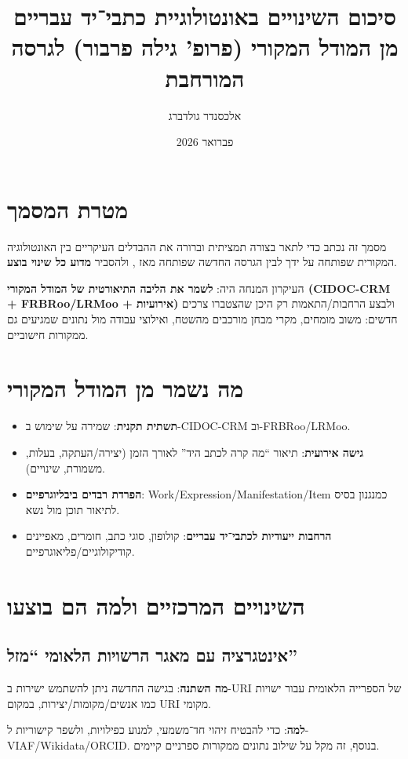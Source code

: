 \documentclass[12pt,a4paper]{article}
\title{%
\textbf{\Large סיכום השינויים באונטולוגיית כתבי־יד עבריים}\\[0.5em]
\normalsize מן המודל המקורי (פרופ' גילה פרבור) לגרסה המורחבת \en{(v1.4)}
}
\author{אלכסנדר גולדברג}
\date{פברואר 2026}
\newcommand{\en}[1]{\textenglish{\LR{#1}}}
\begin{document}
\maketitle

\section{מטרת המסמך}
מסמך זה נכתב כדי לתאר בצורה תמציתית וברורה את ההבדלים העיקריים בין האונטולוגיה המקורית שפותחה על ידך לבין הגרסה החדשה שפותחה מאז \en{(v1.4)}, ולהסביר \textbf{מדוע כל שינוי בוצע}. 

העיקרון המנחה היה: \textbf{לשמר את הליבה התיאורטית של המודל המקורי (CIDOC-CRM + FRBRoo/LRMoo + אירועיות)} ולבצע הרחבות/התאמות רק היכן שהצטברו צרכים חדשים: משוב מומחים, מקרי מבחן מורכבים מהשטח, ואילוצי עבודה מול נתונים שמגיעים גם ממקורות חישוביים.

\section{מה נשמר מן המודל המקורי}
\begin{itemize}
\item \textbf{תשתית תקנית}: שמירה על שימוש ב-\textenglish{CIDOC-CRM} וב-\textenglish{FRBRoo/LRMoo}.
\item \textbf{גישה אירועית}: תיאור ``מה קרה לכתב היד'' לאורך הזמן (יצירה/העתקה, בעלות, משמורת, שינויים).
\item \textbf{הפרדת רבדים ביבליוגרפיים}: \textenglish{Work/Expression/Manifestation/Item} כמנגנון בסיס לתיאור תוכן מול נשא.
\item \textbf{הרחבות ייעודיות לכתבי־יד עבריים}: קולופון, סוגי כתב, חומרים, מאפיינים קודיקולוגיים/פליאוגרפיים.
\end{itemize}

\section{השינויים המרכזיים ולמה הם בוצעו}

\subsection{אינטגרציה עם מאגר הרשויות הלאומי ``מזל'' \en{(NLI Authorities)}}
\textbf{מה השתנה}: בגישה החדשה ניתן להשתמש ישירות ב-\textenglish{URI} של הספרייה הלאומית \en{(NLI)} עבור ישויות כמו אנשים/מקומות/יצירות, במקום \textenglish{URI} מקומי.

\textbf{למה}: כדי להבטיח זיהוי חד־משמעי, למנוע כפילויות, ולשפר קישוריות ל-\textenglish{VIAF/Wikidata/ORCID}. בנוסף, זה מקל על שילוב נתונים ממקורות ספרניים קיימים.
\end{document}
